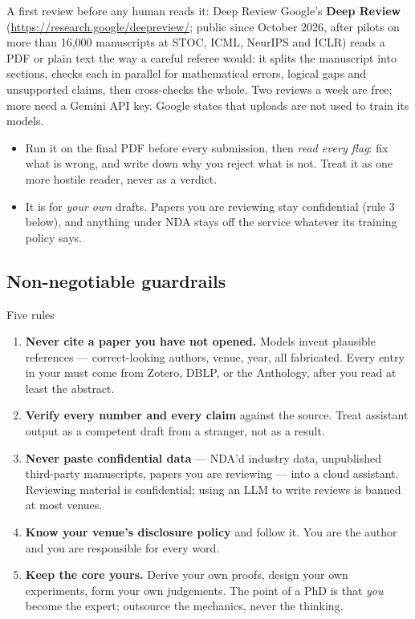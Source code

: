 \documentclass[11pt,a4paper]{article}
\begin{document}
\begin{cbox}{A first review before any human reads it: Deep Review}
Google's \textbf{Deep Review} (\url{https://research.google/deepreview/}; public since
October 2026, after pilots on more than 16,000 manuscripts at STOC, ICML,
NeurIPS and ICLR) reads a PDF or plain text the way a careful referee would:
it splits the manuscript into sections, checks each in parallel for
mathematical errors, logical gaps and unsupported claims, then cross-checks
the whole. Two reviews a week are free; more need a Gemini API key. Google
states that uploads are not used to train its models.
\begin{itemize}
  \item Run it on the final PDF before every submission, then \emph{read every
        flag}: fix what is wrong, and write down why you reject what is not.
        Treat it as one more hostile reader, never as a verdict.
  \item It is for \emph{your own} drafts. Papers you are reviewing stay
        confidential (rule 3 below), and anything under NDA stays off the
        service whatever its training policy says.
\end{itemize}
\end{cbox}

\subsection{Non-negotiable guardrails}

\begin{wbox}{Five rules}
\begin{enumerate}
  \item \textbf{Never cite a paper you have not opened.} Models invent
        plausible references --- correct-looking authors, venue, year, all
        fabricated. Every entry in your  must come from Zotero,
        DBLP, or the Anthology, after you read at least the abstract.
  \item \textbf{Verify every number and every claim} against the source.
        Treat assistant output as a competent draft from a stranger, not as a
        result.
  \item \textbf{Never paste confidential data} --- NDA'd industry data,
        unpublished third-party manuscripts, papers you are reviewing --- into
        a cloud assistant. Reviewing material is confidential; using an LLM to
        write reviews is banned at most venues.
  \item \textbf{Know your venue's disclosure policy} and follow it. You are
        the author and you are responsible for every word.
  \item \textbf{Keep the core yours.} Derive your own proofs, design your own
        experiments, form your own judgements. The point of a PhD is that
        \emph{you} become the expert; outsource the mechanics, never the
        thinking.
\end{enumerate}
\end{wbox}
\end{document}
